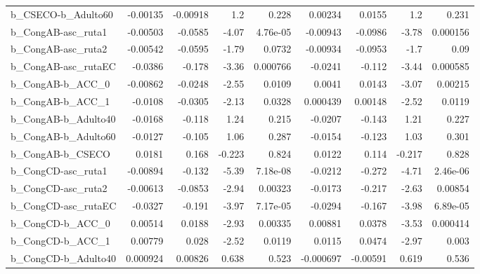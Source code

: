 \begin{tabular}{lrrrrrrrr}
b\_CSECO-b\_Adulto60         &    -0.00135 &     -0.00918 &      1.2 &    0.228 &    0.00234 &      0.0155 &          1.2 &         0.231 \\
b\_CongAB-asc\_ruta1         &    -0.00503 &      -0.0585 &    -4.07 & 4.76e-05 &   -0.00943 &     -0.0986 &        -3.78 &      0.000156 \\
b\_CongAB-asc\_ruta2         &    -0.00542 &      -0.0595 &    -1.79 &   0.0732 &   -0.00934 &     -0.0953 &         -1.7 &          0.09 \\
b\_CongAB-asc\_rutaEC        &     -0.0386 &       -0.178 &    -3.36 & 0.000766 &    -0.0241 &      -0.112 &        -3.44 &      0.000585 \\
b\_CongAB-b\_ACC\_0           &    -0.00862 &      -0.0248 &    -2.55 &   0.0109 &     0.0041 &      0.0143 &        -3.07 &       0.00215 \\
b\_CongAB-b\_ACC\_1           &     -0.0108 &      -0.0305 &    -2.13 &   0.0328 &   0.000439 &     0.00148 &        -2.52 &        0.0119 \\
b\_CongAB-b\_Adulto40        &     -0.0168 &       -0.118 &     1.24 &    0.215 &    -0.0207 &      -0.143 &         1.21 &         0.227 \\
b\_CongAB-b\_Adulto60        &     -0.0127 &       -0.105 &     1.06 &    0.287 &    -0.0154 &      -0.123 &         1.03 &         0.301 \\
b\_CongAB-b\_CSECO           &      0.0181 &        0.168 &   -0.223 &    0.824 &     0.0122 &       0.114 &       -0.217 &         0.828 \\
b\_CongCD-asc\_ruta1         &    -0.00894 &       -0.132 &    -5.39 & 7.18e-08 &    -0.0212 &      -0.272 &        -4.71 &      2.46e-06 \\
b\_CongCD-asc\_ruta2         &    -0.00613 &      -0.0853 &    -2.94 &  0.00323 &    -0.0173 &      -0.217 &        -2.63 &       0.00854 \\
b\_CongCD-asc\_rutaEC        &     -0.0327 &       -0.191 &    -3.97 & 7.17e-05 &    -0.0294 &      -0.167 &        -3.98 &      6.89e-05 \\
b\_CongCD-b\_ACC\_0           &     0.00514 &       0.0188 &    -2.93 &  0.00335 &    0.00881 &      0.0378 &        -3.53 &      0.000414 \\
b\_CongCD-b\_ACC\_1           &     0.00779 &        0.028 &    -2.52 &   0.0119 &     0.0115 &      0.0474 &        -2.97 &         0.003 \\
b\_CongCD-b\_Adulto40        &    0.000924 &      0.00826 &    0.638 &    0.523 &  -0.000697 &    -0.00591 &        0.619 &         0.536 \\

\end{tabular}
